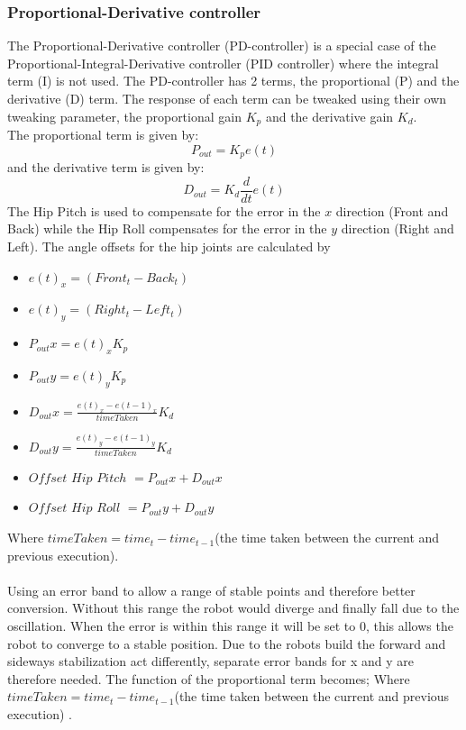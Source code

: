 \documentclass[a4paper]{article}
\begin{document}
\subsubsection{Proportional-Derivative controller}

The Proportional-Derivative controller (PD-controller) is a special case of the
Proportional-Integral-Derivative controller (PID controller) where the integral
term (I) is not used.  The PD-controller has 2 terms, the proportional (P) and
the derivative (D) term. The response of each term can be tweaked using their own tweaking parameter, the proportional gain $K_p$ and the derivative gain $K_d$. \\
The proportional term is given by:
\[
P_{out}  = K_pe(t)
 \]
and the derivative term is given by:
\[
D_{out}  = K_d\frac{d}{dt}e(t)
\]
The Hip Pitch is used to compensate for the error in the $x$ direction (Front
and Back) while the Hip Roll compensates for the error in the $y$ direction (Right and Left).
The angle offsets for the hip joints are calculated by
\begin{itemize}
    \item $e(t)_x = (Front_t - Back_t)$
    \item $e(t)_y = (Right_t - Left_t)$
    \item $P_{out} x = e(t)_xK_p$
    \item $P_{out} y = e(t)_yK_p$
    \item $D_{out} x = \frac{e(t)_x - e(t-1)_x}{timeTaken}K_d$
    \item $D_{out} y = \frac{e(t)_y - e(t-1)_y}{timeTaken}K_d$
    \item  $Offset$ $Hip$ $Pitch$ $= P_{out}x + D_{out}x$ 
    \item $Offset$ $Hip$ $Roll$ $=  P_{out}y + D_{out}y$ 
\end{itemize}
Where $timeTaken = time_t - time_{t-1}$(the time taken between the current and previous execution).\\\\
Using an error band to allow a range of stable points and therefore better conversion. Without this range the robot would diverge and finally fall due to the oscillation. When the error is within this range it will be set to 0, this allows the robot to converge to a stable position. Due to the robots build the forward and sideways stabilization act differently, separate error bands for x and y are therefore needed. The function of the proportional term becomes;
Where $timeTaken = time_t - time_{t-1}$(the time taken between the current and previous execution) .\\\\
\end{document}
